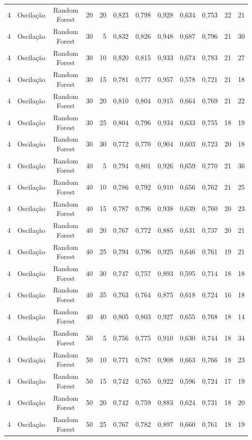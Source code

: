 \begin{longtable}{ccclrrrrrrrr}
4 & Oscilação & Random Forest & 20 & 20 & 0,823 & 0,798 & 0,928 & 0,634 & 0,753 & 22 & 21 \\
4 & Oscilação & Random Forest & 30 & 5 & 0,832 & 0,826 & 0,948 & 0,687 & 0,796 & 21 & 30 \\
4 & Oscilação & Random Forest & 30 & 10 & 0,820 & 0,815 & 0,933 & 0,674 & 0,783 & 21 & 27 \\
4 & Oscilação & Random Forest & 30 & 15 & 0,781 & 0,777 & 0,957 & 0,578 & 0,721 & 21 & 18 \\
4 & Oscilação & Random Forest & 30 & 20 & 0,810 & 0,804 & 0,915 & 0,664 & 0,769 & 21 & 22 \\
4 & Oscilação & Random Forest & 30 & 25 & 0,804 & 0,796 & 0,934 & 0,633 & 0,755 & 18 & 19 \\
4 & Oscilação & Random Forest & 30 & 30 & 0,772 & 0,770 & 0,904 & 0,603 & 0,723 & 20 & 18 \\
4 & Oscilação & Random Forest & 40 & 5 & 0,794 & 0,801 & 0,926 & 0,659 & 0,770 & 21 & 36 \\
4 & Oscilação & Random Forest & 40 & 10 & 0,786 & 0,792 & 0,910 & 0,656 & 0,762 & 21 & 25 \\
4 & Oscilação & Random Forest & 40 & 15 & 0,787 & 0,796 & 0,938 & 0,639 & 0,760 & 20 & 23 \\
4 & Oscilação & Random Forest & 40 & 20 & 0,767 & 0,772 & 0,885 & 0,631 & 0,737 & 20 & 21 \\
4 & Oscilação & Random Forest & 40 & 25 & 0,794 & 0,796 & 0,925 & 0,646 & 0,761 & 19 & 21 \\
4 & Oscilação & Random Forest & 40 & 30 & 0,747 & 0,757 & 0,893 & 0,595 & 0,714 & 18 & 18 \\
4 & Oscilação & Random Forest & 40 & 35 & 0,763 & 0,764 & 0,875 & 0,618 & 0,724 & 16 & 18 \\
4 & Oscilação & Random Forest & 40 & 40 & 0,805 & 0,803 & 0,927 & 0,655 & 0,768 & 18 & 14 \\
4 & Oscilação & Random Forest & 50 & 5 & 0,756 & 0,775 & 0,910 & 0,630 & 0,744 & 18 & 34 \\
4 & Oscilação & Random Forest & 50 & 10 & 0,771 & 0,787 & 0,908 & 0,663 & 0,766 & 18 & 23 \\
4 & Oscilação & Random Forest & 50 & 15 & 0,742 & 0,765 & 0,922 & 0,596 & 0,724 & 17 & 19 \\
4 & Oscilação & Random Forest & 50 & 20 & 0,742 & 0,759 & 0,883 & 0,624 & 0,731 & 18 & 20 \\
4 & Oscilação & Random Forest & 50 & 25 & 0,767 & 0,782 & 0,897 & 0,660 & 0,761 & 18 & 19 \\

\end{longtable}
